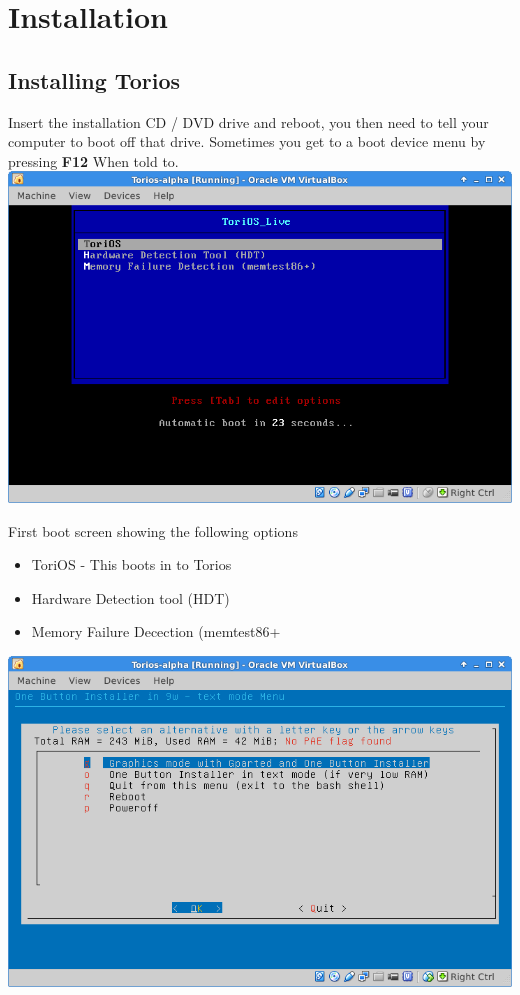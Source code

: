 \documentclass[12pt,a4paper]{book}
\begin{document}
\newpage
\section{Installation}

\subsection{Installing Torios}

Insert the installation CD / DVD drive and reboot, you then need to tell your computer to boot off that drive.  Sometimes you get to a boot device menu by pressing \textbf{F12} When told to.  \\

\includegraphics[width=0.7\linewidth]{boot-screen1}

First boot screen showing the following options \\

\begin{itemize}
\item{ToriOS - This boots in to Torios} 
\item{Hardware Detection tool (HDT)}
\item{Memory Failure Decection (memtest86+}
\end{itemize}

\includegraphics[width=0.7\linewidth]{boot-screen2}
\end{document}
